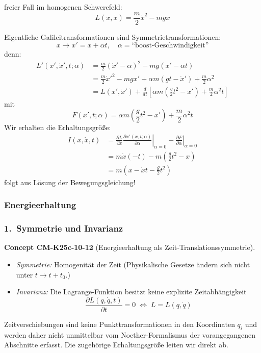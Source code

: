 \documentclass[10pt, letterpaper]{article}
\newcommand{\CustomHeading}[3]{%
  \par\medskip\noindent%
  \textbf{#1 #2} \textnormal{(#3)}.\enskip%
}
\newenvironment{CONC}[2]{\begin{unitbox}\CustomHeading{Concept}{#1}{#2}}{\end{unitbox}}
\begin{document}
freier Fall im homogenen Schwerefeld:
\[L(x,\dot{x}) = \frac{m}{2}\dot{x}^2 - mgx\]

Eigentliche Galileitransformationen sind Symmetrietransformationen:
\[x \to x' = x + \alpha t, \quad \alpha = \text{``boost-Geschwindigkeit''}\]
denn:
\begin{align*}
L'(x',\dot{x}',t;\alpha) &= \frac{m}{2}(\dot{x}'-\alpha)^2 - mg(x'-\alpha t) \\
&= \frac{m}{2}\dot{x}'^2 - mgx' + \alpha m\left(gt-\dot{x}'\right) + \frac{m}{2}\alpha^2 \\
&= L(x',\dot{x}') + \frac{d}{dt}\left[\alpha m\left(\frac{g}{2}t^2-x'\right) + \frac{m}{2}\alpha^2t\right]
\end{align*}
mit 
$$F(x',t;\alpha)=\alpha m\left(\frac{g}{2}t^2-x'\right) + \frac{m}{2}\alpha^2t$$
Wir erhalten die Erhaltungsgröße:
\begin{align*}
I(x,\dot{x},t) &= \frac{\partial L}{\partial \dot{x}}\left.\frac{\partial x'(x,t;\alpha)}{\partial \alpha}\right|_{\alpha=0} - \left.\frac{\partial F}{\partial \alpha}\right|_{\alpha=0} \\
&= m\dot{x}(-t) - m\left(\frac{g}{2}t^2-x\right) \\
&= m\left(x-\dot{x}t - \frac{g}{2}t^2\right)
\end{align*}
folgt aus Lösung der Bewegungsgleichung!




\subsubsection{Energieerhaltung}



\subsubsection*{1.\ Symmetrie und Invarianz}

\begin{CONC}{CM-K25c-10-12}{Energieerhaltung als Zeit‐Translationssymmetrie}
\begin{itemize}
\item \emph{Symmetrie:} Homogenität der Zeit  
      (Physikalische Gesetze ändern sich nicht unter
      $t\!\to\!t+t_0$.)
\item \emph{Invarianz:} Die Lagrange‐Funktion besitzt keine
      explizite Zeitabhängigkeit
      \[
        \boxed{\;
          \frac{\partial L(q,\dot q,t)}{\partial t}=0
          \;\Longleftrightarrow\;
          L=L(q,\dot q)
        \;}
      \]
\end{itemize}

Zeitverschiebungen sind keine Punkttransformationen in den
Koordinaten $q_i$ und werden daher nicht unmittelbar vom
Noether-Formalismus der vorangegangenen Abschnitte erfasst.  
Die zugehörige Erhaltungsgröße leiten wir direkt ab.
\end{CONC}
\end{document}
